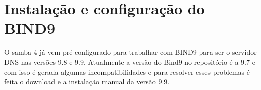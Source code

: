 
\section{Instalação e configuração do BIND9}

O samba 4 já vem pré configurado para trabalhar com BIND9 para ser o servidor DNS nas versões 9.8 e 9.9.
Atualmente a versão do Bind9 no repositório é a 9.7 e com isso é gerada algumas incompatibilidades e para resolver esses problemas é feita o download e a  instalação manual da versão 9.9.

